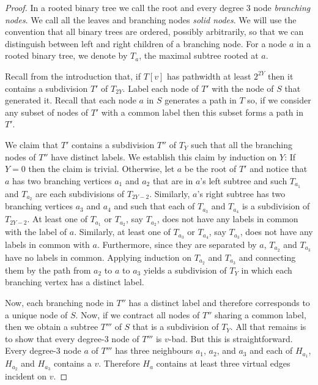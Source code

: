 \documentclass[a4paper,11pt]{article}
\theoremstyle{plain}
\theoremstyle{definition}
\begin{document}
\begin{proof}
  In a rooted binary tree we call the root and every degree 3 node
  \emph{branching nodes}. We call all the leaves and branching nodes
  \emph{solid nodes}. We will use the convention that all binary trees
  are ordered, possibly arbitrarily, so that we can distinguish between
  left and right children of a branching node.  For a node $a$ in a rooted
  binary tree, we denote by $T_a$, the maximal subtree rooted at $a$.

  Recall from the introduction that, if $T[v]$
  has pathwidth at least $2^{2Y}$ then it contains a subdivision $T'$
  of $T_{2Y}$.  Label each node of $T'$ with the node of $S$ that
  generated it.
  Recall that each node $a$ in $S$ generates a path in $T$ so, if we
  consider any subset of nodes of $T'$ with a common label then this
  subset forms a path in $T'$.

  We claim that $T'$ contains a subdivision $T''$ of $T_{Y}$ such that
  all the branching nodes of $T''$ have distinct labels.  We establish
  this claim by induction on $Y$: If $Y=0$ then the claim is trivial.
  Otherwise, let $a$ be the root of $T'$ and notice that $a$ has two
  branching vertices $a_1$ and $a_2$ that are in $a$'s left subtree
  and such $T_{a_1}$ and $T_{a_2}$ are each subdivisions of $T_{2Y-2}$.
  Similarly, $a$'s right subtree has two branching vertices $a_3$ and
  $a_4$ and such that each of $T_{a_3}$ and $T_{a_4}$ is a subdivision
  of $T_{2Y-2}$.  At least one of $T_{a_1}$ or $T_{a_2}$, say $T_{a_2}$,
  does not have any labels in common with the label of $a$.  Similarly,
  at least one of $T_{a_3}$ or $T_{a_4}$, say $T_{a_3}$, does not
  have any labels in common with $a$.  Furthermore, since they are
  separated by $a$, $T_{a_2}$ and $T_{a_3}$ have no labels in common.
  Applying induction on $T_{a_2}$ and $T_{a_3}$ and connecting them by
  the path from $a_2$ to $a$ to $a_3$ yields a subdivision of $T_{Y}$
  in which each branching vertex has a distinct label.

  Now, each branching node in $T''$ has a distinct label and therefore
  corresponds to a unique node of $S$.  Now, if we contract all nodes of
  $T''$ sharing a common label, then we obtain a subtree $T'''$ of $S$
  that is a subdivision of $T_{Y}$. All that remains is to show that every
  degree-3 node of $T'''$ is $v$-bad.  But this is straightforward. Every
  degree-3 node $a$ of $T'''$ has three neighbours $a_1$, $a_2$, and
  $a_3$ and each of $H_{a_1}$, $H_{a_2}$ and $H_{a_3}$ contains a $v$.
  Therefore $H_a$ contains at least three virtual edges incident on $v$.
\end{proof}
\end{document}
